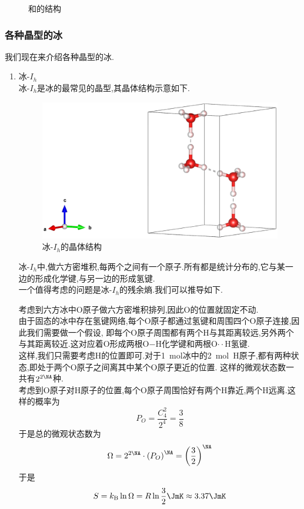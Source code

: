 \documentclass{ctexart}
\begin{document}
\begin{enumerate}[label=\tbf{\arabic*},topsep=0pt,parsep=0pt,itemsep=0pt,partopsep=0pt]
\begin{figure}[H]
            \caption{\ce{[(C9H18)3(NH)2Cl]^+}和的结构}
        \end{figure}
\end{enumerate}
\subsubsection{各种晶型的冰}我们现在来介绍各种晶型的冰.
\begin{enumerate}[label=\tbf{\arabic*},topsep=0pt,parsep=0pt,itemsep=0pt,partopsep=0pt]
    \item 冰-$I_h$\\
        冰-$I_h$是冰的最常见的晶型,其晶体结构示意如下.
        \begin{figure}[H]
            \centering\includegraphics[scale=0.125]{picture/Ih-Ice.eps}
            \caption{冰-$I_h$的晶体结构}
        \end{figure}
        冰-$I_h$中,做六方密堆积,每两个之间有一个原子.所有都是统计分布的,它与某一边的形成化学键,与另一边的形成氢键.\\
        一个值得考虑的问题是冰-$I_h$的残余熵.我们可以推导如下.
        \begin{derivation}
            考虑到六方冰中O原子做六方密堆积排列,因此O的位置就固定不动.\\
            由于固态的冰中存在氢键网络,每个O原子都通过氢键和周围四个O原子连接,因此我们需要做一个假设,%
            即每个O原子周围都有两个H与其距离较远,另外两个与其距离较近.这对应着O形成两根O$-$H化学键和两根O$\cdot\cdot$H氢键.\\
            这样,我们只需要考虑H的位置即可.对于1\ mol冰中的2\ mol\ H原子,都有两种状态,即处于两个O原子之间离其中某个O原子更近的位置.%
            这样的微观状态数一共有$2^{2\NA}$种.\\
            考虑到O原子对H原子的位置,每个O原子周围恰好有两个H靠近,两个H远离.这样的概率为
            \[P_O=\dfrac{C_4^2}{2^4}=\dfrac{3}{8}\]
            于是总的微观状态数为
            \[\Omega=2^{2\NA}\cdot\left(P_O\right)^{\NA}=\left(\dfrac32\right)^{\NA}\]
            于是
            \[S=k_\text B\ln\Omega=R\ln\dfrac32\JmK\approx3.37\JmK\]
            

\end{derivation}
\end{enumerate}
\end{document}
